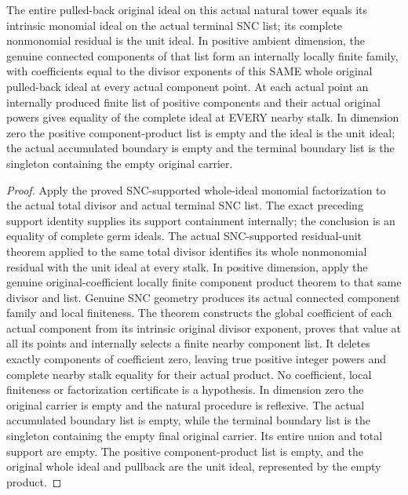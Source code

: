 \begin{theorem}
\label{hir:general-nc-natural-original-coefficient-factorization}
\leanok
The entire pulled-back original ideal on this actual natural tower equals its
intrinsic monomial ideal on the actual terminal SNC list; its complete
nonmonomial residual is the unit ideal. In positive ambient
dimension, the genuine connected components of that list form an internally
locally finite family, with coefficients equal to the divisor exponents of
this SAME whole original pulled-back ideal at every actual component point.
At each actual point an internally produced finite list of positive components
and their actual original powers gives equality of the complete ideal at EVERY
nearby stalk. In dimension zero the positive component-product list is empty and the ideal is
the unit ideal; the actual accumulated boundary is empty and the terminal
boundary list is the singleton containing the empty original carrier.
\end{theorem}
\begin{proof}
Apply the proved SNC-supported whole-ideal monomial factorization to the actual
total divisor and actual terminal SNC list. The exact preceding support
identity supplies its support containment internally; the conclusion is an
equality of complete germ ideals. The actual SNC-supported residual-unit theorem
applied to the same total divisor identifies its whole nonmonomial residual
with the unit ideal at every stalk. In positive dimension, apply the genuine
original-coefficient locally finite component product theorem to that same
divisor and list. Genuine SNC geometry produces its actual connected component
family and local finiteness. The theorem constructs the global coefficient of
each actual component from its intrinsic original divisor exponent, proves that
value at all its points and internally selects a finite nearby component list.
It deletes exactly components of coefficient zero, leaving true positive
integer powers and complete nearby stalk equality for their actual product.
No coefficient, local finiteness or factorization certificate is a hypothesis.
In dimension zero the original carrier is empty and the natural procedure is
reflexive. The actual accumulated boundary list is empty, while the terminal
boundary list is the singleton containing the empty final original carrier.
Its entire union and total support are empty. The positive component-product
list is empty, and the original whole ideal and pullback are the unit ideal,
represented by the empty product.
\end{proof}

